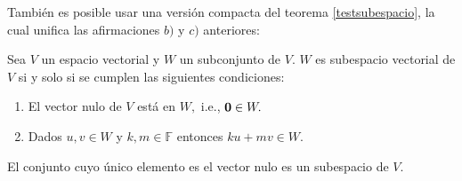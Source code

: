También es posible usar una versión compacta del teorema \ref{testsubespacio}, la cual unifica las afirmaciones $b)$ y $c)$ anteriores: 

\begin{coro} \label{testsubespacioversioncompacta}
Sea $V$ un espacio vectorial y $W$ un subconjunto de $V.$ $W$ es subespacio vectorial de $V$ si y solo si se cumplen las siguientes condiciones:
\begin{enumerate}[$a)$]
\item El vector nulo de $V$ está en $W,$ i.e., ${\bf{0}}\in W.$
\item Dados $u,v\in W$ y $k, m \in \mathbb{F}$ entonces $ku+mv\in W.$
\end{enumerate}
\end{coro}
\begin{rem}El conjunto cuyo único elemento es el vector nulo es un subespacio de $V.$  
\end{rem}

